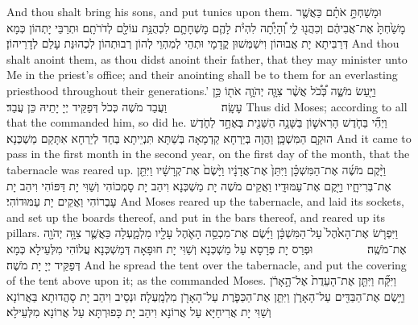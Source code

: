 {And thou shalt bring his sons, and put tunics upon them.}{}
{וּמָשַׁחְתָּ֣ אֹתָ֗ם כַּאֲשֶׁ֤ר מָשַׁ֙חְתָּ֙ אֶת־אֲבִיהֶ֔ם וְכִהֲנ֖וּ לִ֑י וְ֠הָיְתָ֠ה לִהְיֹ֨ת לָהֶ֧ם מׇשְׁחָתָ֛ם לִכְהֻנַּ֥ת עוֹלָ֖ם לְדֹרֹתָֽם׃}
{וּתְרַבֵּי יָתְהוֹן כְּמָא דְּרַבִּיתָא יָת אֲבוּהוֹן וִישַׁמְּשׁוּן קֳדָמָי וּתְהֵי לְמִהְוֵי לְהוֹן רְבוּתְהוֹן לִכְהוּנַּת עָלַם לְדָרֵיהוֹן׃}
{And thou shalt anoint them, as thou didst anoint their father, that they may minister unto Me in the priest’s office; and their anointing shall be to them for an everlasting priesthood throughout their generations.’}{}
{וַיַּ֖עַשׂ מֹשֶׁ֑ה כְּ֠כֹ֠ל אֲשֶׁ֨ר צִוָּ֧ה יְהֹוָ֛ה אֹת֖וֹ כֵּ֥ן עָשָֽׂה׃ \setuma         }
{וַעֲבַד מֹשֶׁה כְּכֹל דְּפַקֵּיד יְיָ יָתֵיהּ כֵּן עֲבַד׃}
{Thus did Moses; according to all that the \lord\space commanded him, so did he.}{}
{וַיְהִ֞י בַּחֹ֧דֶשׁ הָרִאשׁ֛וֹן בַּשָּׁנָ֥ה הַשֵּׁנִ֖ית בְּאֶחָ֣ד לַחֹ֑דֶשׁ הוּקַ֖ם הַמִּשְׁכָּֽן׃}
{וַהֲוָה בְּיַרְחָא קַדְמָאָה בְּשַׁתָּא תִּנְיֵיתָא בְּחַד לְיַרְחָא אִתָּקַם מַשְׁכְּנָא׃}
{And it came to pass in the first month in the second year, on the first day of the month, that the tabernacle was reared up.}{}
{וַיָּ֨קֶם מֹשֶׁ֜ה אֶת־הַמִּשְׁכָּ֗ן וַיִּתֵּן֙ אֶת־אֲדָנָ֔יו וַיָּ֙שֶׂם֙ אֶת־קְרָשָׁ֔יו וַיִּתֵּ֖ן אֶת־בְּרִיחָ֑יו וַיָּ֖קֶם אֶת־עַמּוּדָֽיו׃}
{וַאֲקֵים מֹשֶׁה יָת מַשְׁכְּנָא וִיהַב יָת סָמְכוֹהִי וְשַׁוִּי יָת דַּפּוֹהִי וִיהַב יָת עָבְרוֹהִי וַאֲקֵים יָת עַמּוּדוֹהִי׃}
{And Moses reared up the tabernacle, and laid its sockets, and set up the boards thereof, and put in the bars thereof, and reared up its pillars.}{}
{וַיִּפְרֹ֤שׂ אֶת־הָאֹ֙הֶל֙ עַל־הַמִּשְׁכָּ֔ן וַיָּ֜שֶׂם אֶת־מִכְסֵ֥ה הָאֹ֛הֶל עָלָ֖יו מִלְמָ֑עְלָה כַּאֲשֶׁ֛ר צִוָּ֥ה יְהֹוָ֖ה אֶת־מֹשֶֽׁה׃ \setuma         
}
{וּפְרַס יָת פְּרָסָא עַל מַשְׁכְּנָא וְשַׁוִּי יָת חוּפָאָה דְּמַשְׁכְּנָא עֲלוֹהִי מִלְּעֵילָא כְּמָא דְּפַקֵּיד יְיָ יָת מֹשֶׁה׃}
{And he spread the tent over the tabernacle, and put the covering of the tent above upon it; as the \lord\space commanded Moses.}{}
{וַיִּקַּ֞ח וַיִּתֵּ֤ן אֶת־הָעֵדֻת֙ אֶל־הָ֣אָרֹ֔ן וַיָּ֥שֶׂם אֶת־הַבַּדִּ֖ים עַל־הָאָרֹ֑ן וַיִּתֵּ֧ן אֶת־הַכַּפֹּ֛רֶת עַל־הָאָרֹ֖ן מִלְמָֽעְלָה׃
}
{וּנְסֵיב וִיהַב יָת סָהֲדוּתָא בַּאֲרוֹנָא וְשַׁוִּי יָת אֲרִיחַיָּא עַל אֲרוֹנָא וִיהַב יָת כָּפוּרְתָּא עַל אֲרוֹנָא מִלְּעֵילָא׃}
